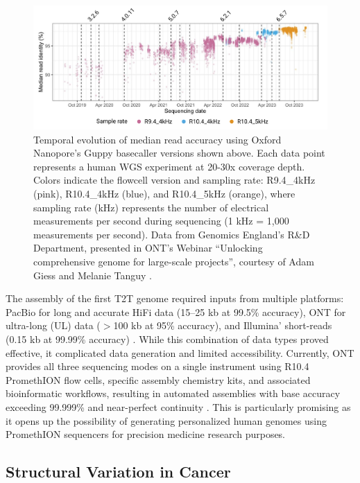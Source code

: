 \begin{figure}[H]
    \centering
    \includegraphics[width=\textwidth]{img/ONT_updates.pdf}
    \caption[Evolution of ONT basecalling accuracy]{Temporal evolution of median 
    read accuracy using Oxford Nanopore's Guppy basecaller versions shown 
    above. Each data point represents a human WGS experiment at 20-30x coverage 
    depth. Colors indicate the flowcell version and sampling rate: R9.4\_4kHz 
    (pink), R10.4\_4kHz (blue), and R10.4\_5kHz (orange), where sampling rate 
    (kHz) represents the number of electrical measurements per second during 
    sequencing (1 kHz = 1,000 measurements per second). Data from Genomics 
    England's R\&D Department, presented in ONT's Webinar ``Unlocking 
    comprehensive genome for large-scale projects'', courtesy of Adam Giess and 
    Melanie Tanguy \cite{oxford_nanopore_technologies_unlocking_2024}.}
    \label{fig:ONT_updates}
\end{figure}

The assembly of the first T2T genome required inputs from multiple platforms: 
PacBio for long and accurate HiFi data (15--25 kb at 99.5\% accuracy), 
ONT for ultra-long (UL) data ($>$100 kb at 95\% accuracy), and Illumina' 
short-reads (0.15 kb at 99.99\% accuracy) \cite{li_genome_2024}. While this 
combination of data types proved effective, it complicated data generation and 
limited accessibility. Currently, ONT provides all three sequencing modes on a 
single instrument using R10.4 PromethION flow cells, specific assembly chemistry 
kits, and associated bioinformatic workflows, resulting in automated assemblies 
with base accuracy exceeding 99.999\% and near-perfect continuity
\cite{koren_gapless_2024}. This is particularly promising as it opens up the 
possibility of generating personalized human genomes using PromethION sequencers 
for precision medicine research purposes.

\subsection{Structural Variation in Cancer}

